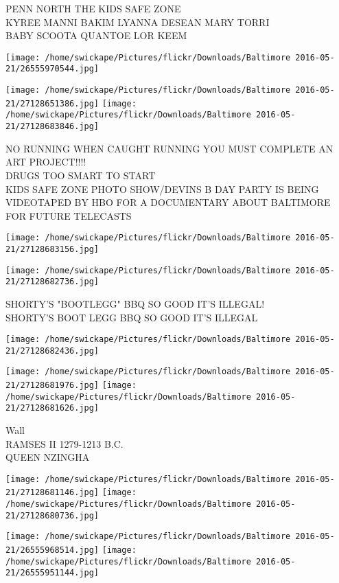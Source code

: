 \documentclass[10pt,letterpaper]{article}
\begin{document}
PENN NORTH THE KIDS SAFE ZONE\\
KYREE MANNI BAKIM LYANNA DESEAN MARY TORRI\\
BABY SCOOTA QUANTOE LOR KEEM
\pagebreak

\texttt{[image: /home/swickape/Pictures/flickr/Downloads/Baltimore 2016-05-21/26555970544.jpg]}

\vspace{0.25in}
\texttt{[image: /home/swickape/Pictures/flickr/Downloads/Baltimore 2016-05-21/27128651386.jpg]}
\texttt{[image: /home/swickape/Pictures/flickr/Downloads/Baltimore 2016-05-21/27128683846.jpg]}

NO RUNNING WHEN CAUGHT RUNNING YOU MUST COMPLETE AN ART PROJECT!!!!\\
DRUGS TOO SMART TO START\\
KIDS SAFE ZONE PHOTO SHOW/DEVINS B DAY PARTY IS BEING VIDEOTAPED BY HBO FOR A DOCUMENTARY ABOUT BALTIMORE FOR FUTURE TELECASTS
\pagebreak

\texttt{[image: /home/swickape/Pictures/flickr/Downloads/Baltimore 2016-05-21/27128683156.jpg]}

\vspace{0.25in}
\texttt{[image: /home/swickape/Pictures/flickr/Downloads/Baltimore 2016-05-21/27128682736.jpg]}

SHORTY'S "BOOTLEGG" BBQ SO GOOD IT'S ILLEGAL!\\
SHORTY'S BOOT LEGG BBQ SO GOOD IT'S ILLEGAL
\pagebreak

\texttt{[image: /home/swickape/Pictures/flickr/Downloads/Baltimore 2016-05-21/27128682436.jpg]}

\vspace{0.25in}
\texttt{[image: /home/swickape/Pictures/flickr/Downloads/Baltimore 2016-05-21/27128681976.jpg]}
\texttt{[image: /home/swickape/Pictures/flickr/Downloads/Baltimore 2016-05-21/27128681626.jpg]}

Wall\\
RAMSES II 1279{-}1213 B.C.\\
QUEEN NZINGHA
\pagebreak

\texttt{[image: /home/swickape/Pictures/flickr/Downloads/Baltimore 2016-05-21/27128681146.jpg]}
\texttt{[image: /home/swickape/Pictures/flickr/Downloads/Baltimore 2016-05-21/27128680736.jpg]}

\texttt{[image: /home/swickape/Pictures/flickr/Downloads/Baltimore 2016-05-21/26555968514.jpg]}
\texttt{[image: /home/swickape/Pictures/flickr/Downloads/Baltimore 2016-05-21/26555951144.jpg]}
\end{document}
